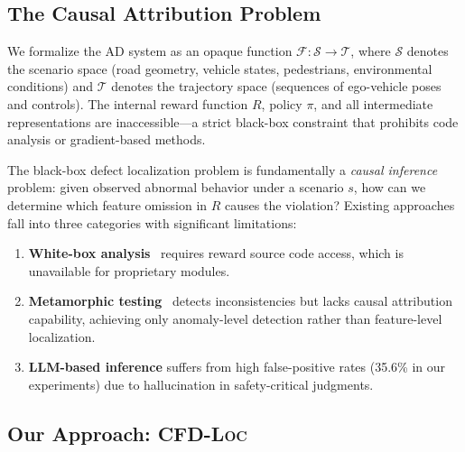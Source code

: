 \documentclass[journal]{IEEEtran}
\theoremstyle{plain}
\theoremstyle{definition}
\theoremstyle{remark}
\newcommand{\methodname}{\textsc{CFD-Loc}}
\newcommand{\scenario}{\mathcal{S}}
\newcommand{\traj}{\mathcal{T}}
\newcommand{\sys}{\mathcal{F}}
\begin{document}
\subsection{The Causal Attribution Problem}

We formalize the AD system as an opaque function $\sys: \scenario \to \traj$, where $\scenario$ denotes the scenario space (road geometry, vehicle states, pedestrians, environmental conditions) and $\traj$ denotes the trajectory space (sequences of ego-vehicle poses and controls). The internal reward function $R$, policy $\pi$, and all intermediate representations are inaccessible---a strict black-box constraint that prohibits code analysis or gradient-based methods.

The black-box defect localization problem is fundamentally a \emph{causal inference} problem: given observed abnormal behavior under a scenario $s$, how can we determine which feature omission in $R$ causes the violation? Existing approaches fall into three categories with significant limitations:
\begin{enumerate}[nosep]
    \item \textbf{White-box analysis}~\cite{knox2023reward} requires reward source code access, which is unavailable for proprietary modules.
    \item \textbf{Metamorphic testing}~\cite{deng2023rmt} detects inconsistencies but lacks causal attribution capability, achieving only anomaly-level detection rather than feature-level localization.
    \item \textbf{LLM-based inference} suffers from high false-positive rates (35.6\% in our experiments) due to hallucination in safety-critical judgments.
\end{enumerate}

\subsection{Our Approach: \methodname}
\end{document}
